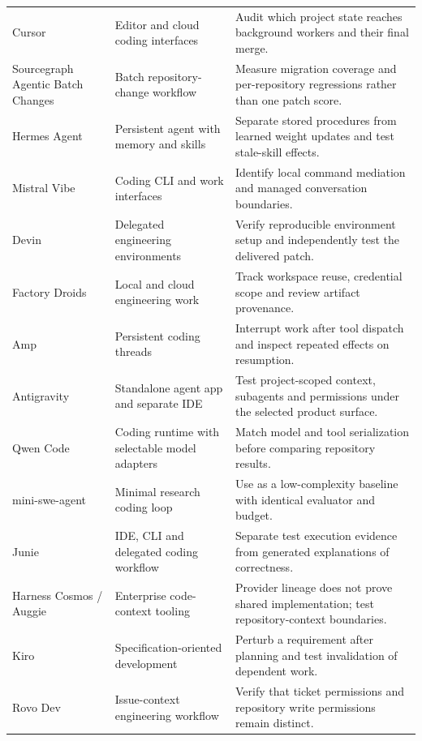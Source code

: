 \begin{longtable}{L{25mm}L{35mm}L{48mm}}
Cursor\cite{executionproduct027} & Editor and cloud coding interfaces & Audit which project state reaches background workers and their final merge. \\
Sourcegraph Agentic Batch Changes\cite{executionproduct028} & Batch repository-change workflow & Measure migration coverage and per-repository regressions rather than one patch score. \\
Hermes Agent\cite{executionproduct030} & Persistent agent with memory and skills & Separate stored procedures from learned weight updates and test stale-skill effects. \\
Mistral Vibe\cite{executionproduct036} & Coding CLI and work interfaces & Identify local command mediation and managed conversation boundaries. \\
Devin\cite{executionproduct037} & Delegated engineering environments & Verify reproducible environment setup and independently test the delivered patch. \\
Factory Droids\cite{executionproduct038} & Local and cloud engineering work & Track workspace reuse, credential scope and review artifact provenance. \\
Amp\cite{executionproduct050} & Persistent coding threads & Interrupt work after tool dispatch and inspect repeated effects on resumption. \\
Antigravity\cite{cumb2026antigravity2} & Standalone agent app and separate IDE & Test project-scoped context, subagents and permissions under the selected product surface. \\
Qwen Code\cite{cumb2026qwencode} & Coding runtime with selectable model adapters & Match model and tool serialization before comparing repository results. \\
mini-swe-agent\cite{executionproduct065} & Minimal research coding loop & Use as a low-complexity baseline with identical evaluator and budget. \\
Junie\cite{executionproduct067} & IDE, CLI and delegated coding workflow & Separate test execution evidence from generated explanations of correctness. \\
Harness Cosmos / Auggie\cite{executionproduct069} & Enterprise code-context tooling & Provider lineage does not prove shared implementation; test repository-context boundaries. \\
Kiro\cite{executionproduct070} & Specification-oriented development & Perturb a requirement after planning and test invalidation of dependent work. \\
Rovo Dev\cite{executionproduct073} & Issue-context engineering workflow & Verify that ticket permissions and repository write permissions remain distinct. \\

\end{longtable}
